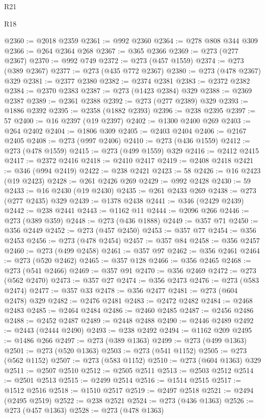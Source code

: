 \begin{lexlean}{R21}
\begin{lexlean}{R18}
\begin{coremodule}
{{{{{{{{{{{{{{{{{{{{{{{{{{{{{{{{{{{{{{{{{{{{{{{{{{{{{{{{{{{{{{{{{{{{{{{{{{{{{{{{{{{{{{{{{{{{{{{{{{{{{{{{{{{{{{{{{{{{{{{{{{{{{{{{{{{{{{{{{{{{{{{@2360 := @2018 @2359
@2361 := @992 @2360
@2364 := @278 @808 @344 @309
@2366 := @264 @2364 @268
@2367 := @365 @2366
@2369 := @273 (@277 @2367)
@2370 := @992 @749
@2372 := @273 (@457 @1559)
@2374 := @273 (@389 @2367)
@2377 := @273 (@435 @772 @2367)
@2380 := @273 (@478 @2367) @329
@2381 := @2377 @2380
@2382 := @2374 @2381
@2383 := @2372 @2382
@2384 := @2370 @2383
@2387 := @273 (@1423 @2384) @329
@2388 := @2369 @2387
@2389 := @2361 @2388
@2392 := @273 (@277 @2389) @329
@2393 := @1886 @2392
@2395 := @2358 (@1882 @2393)
@2396 := @238 @2395
@2397 := 57
@2400 := @16 @2397 (@19 @2397)
@2402 := @1300 @2400 @269
@2403 := @264 @2402
@2404 := @1806 @309
@2405 := @2403 @2404
@2406 := @2167 @2405
@2408 := @273 (@997 @2406)
@2410 := @273 (@436 @1559)
@2412 := @273 (@478 @1559)
@2415 := @273 (@499 @1559) @329
@2416 := @2412 @2415
@2417 := @2372 @2416
@2418 := @2410 @2417
@2419 := @2408 @2418
@2421 := @346 (@994 @2419)
@2422 := @238 @2421
@2423 := 58
@2426 := @16 @2423 (@19 @2423)
@2428 := @261 @2426 @269
@2429 := @992 @2428
@2430 := 59
@2433 := @16 @2430 (@19 @2430)
@2435 := @261 @2433 @269
@2438 := @273 (@277 @2435) @329
@2439 := @1378 @2438
@2441 := @346 (@2429 @2439)
@2442 := @238 @2441
@2443 := @1162 @11
@2444 := @2096 @266
@2446 := @273 (@389 @359)
@2448 := @273 (@436 @1888)
@2449 := @357 @71
@2450 := @356 @2449
@2452 := @273 (@457 @2450)
@2453 := @357 @77
@2454 := @356 @2453
@2456 := @273 (@478 @2454)
@2457 := @357 @84
@2458 := @356 @2457
@2460 := @273 (@499 @2458)
@2461 := @357 @97
@2462 := @356 @2461
@2464 := @273 (@520 @2462)
@2465 := @357 @128
@2466 := @356 @2465
@2468 := @273 (@541 @2466)
@2469 := @357 @91
@2470 := @356 @2469
@2472 := @273 (@562 @2470)
@2473 := @357 @27
@2474 := @356 @2473
@2476 := @273 (@583 @2474)
@2477 := @357 @33
@2478 := @356 @2477
@2481 := @273 (@604 @2478) @329
@2482 := @2476 @2481
@2483 := @2472 @2482
@2484 := @2468 @2483
@2485 := @2464 @2484
@2486 := @2460 @2485
@2487 := @2456 @2486
@2488 := @2452 @2487
@2489 := @2448 @2488
@2490 := @2446 @2489
@2492 := @2443 (@2444 @2490)
@2493 := @238 @2492
@2494 := @1162 @209
@2495 := @1486 @266
@2497 := @273 (@389 @1363)
@2499 := @273 (@499 @1363)
@2501 := @273 (@520 @1363)
@2503 := @273 (@541 @1152)
@2505 := @273 (@562 @1152)
@2507 := @273 (@583 @1152)
@2510 := @273 (@604 @1363) @329
@2511 := @2507 @2510
@2512 := @2505 @2511
@2513 := @2503 @2512
@2514 := @2501 @2513
@2515 := @2499 @2514
@2516 := @1514 @2515
@2517 := @1512 @2516
@2518 := @1510 @2517
@2519 := @2497 @2518
@2521 := @2494 (@2495 @2519)
@2522 := @238 @2521
@2524 := @273 (@436 @1363)
@2526 := @273 (@457 @1363)
@2528 := @273 (@478 @1363)
}}}}}}}}}}}}}}}}}}}}}}}}}}}}}}}}}}}}}}}}}}}}}}}}}}}}}}}}}}}}}}}}}}}}}}}}}}}}}}}}}}}}}}}}}}}}}}}}}}}}}}}}}}}}}}}}}}}}}}}}}}}}}}}}}}}}}}}}}}}}}}}
\end{coremodule}
\end{lexlean}
\end{lexlean}
